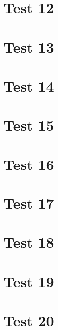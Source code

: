 \documentclass[a4paper]{article}
\begin{document}
\section{Test 12}
\label{sec:test-12}
\section{Test 13}
\label{sec:test-13}
\section{Test 14}
\label{sec:test-14}
\section{Test 15}
\label{sec:test-15}
\section{Test 16}
\label{sec:test-16}
\section{Test 17}
\label{sec:test-17}
\section{Test 18}
\label{sec:test-18}
\section{Test 19}
\label{sec:test-19}
\section{Test 20}
\label{sec:test-20}
\end{document}
